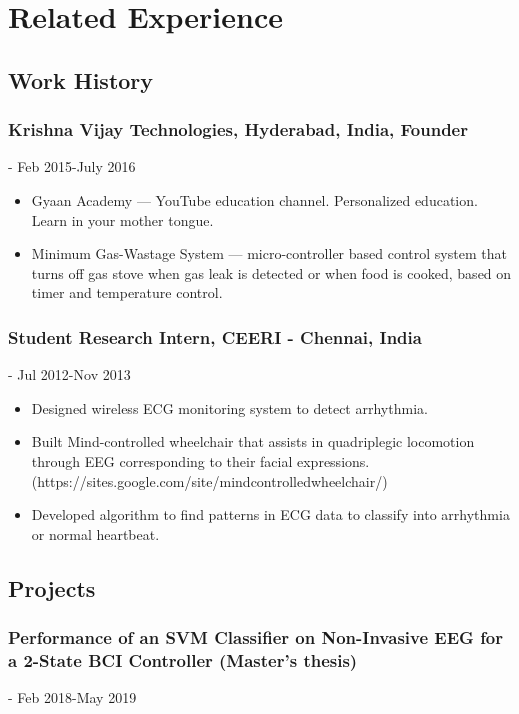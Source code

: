 \documentclass{article}
\begin{document}
\section{Related Experience}
\subsection{Work History}

\subsubsection{Krishna Vijay Technologies, Hyderabad, India, Founder} - Feb 2015-July 2016
\begin{itemize}
    \item Gyaan Academy --- YouTube education channel. Personalized education. Learn in your mother tongue.
    \item Minimum Gas-Wastage System --- micro-controller based control system that turns off gas stove when gas leak is detected or when food is cooked, based on timer and temperature control.
\end{itemize}
    
\subsubsection{Student Research Intern, CEERI - Chennai, India} - Jul 2012-Nov 2013
\begin{itemize}
    \item Designed wireless ECG monitoring system to detect arrhythmia.
    \item Built Mind-controlled wheelchair that assists in quadriplegic locomotion through EEG corresponding to their facial expressions.
    (https://sites.google.com/site/mindcontrolledwheelchair/)
    \item Developed algorithm to find patterns in ECG data to classify into arrhythmia or normal heartbeat.
\end{itemize}


\subsection{Projects}
\subsubsection{Performance of an SVM Classifier on Non-Invasive EEG for a 2-State BCI Controller (Master's thesis)} - Feb 2018-May 2019
\end{document}
